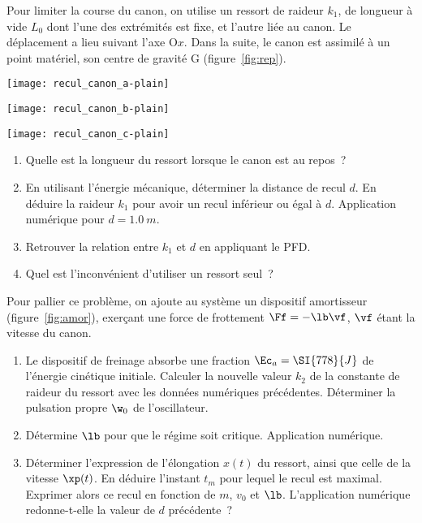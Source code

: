 \documentclass[a4paper, 12pt, final, garamond]{book}
\begin{document}
Pour limiter la course du canon, on utilise un ressort de raideur $k_1$, de
longueur à vide $L_0$ dont l'une des extrémités est fixe, et l'autre liée au
canon. Le déplacement a lieu suivant l'axe O$x$. Dans la suite, le canon est
assimilé à un point matériel, son centre de gravité G (figure~\ref{fig:rep}).

\begin{minipage}{0.40\linewidth}
    \begin{center}
        \texttt{[image: recul\_canon\_a-plain]}
        \label{fig:canon}
    \end{center}
\end{minipage}
\hfill
\begin{minipage}{0.23\linewidth}
    \begin{center}
        \texttt{[image: recul\_canon\_b-plain]}
        \label{fig:rep}
    \end{center}
\end{minipage}
\hfill
\begin{minipage}{0.31\linewidth}
    \begin{center}
        \texttt{[image: recul\_canon\_c-plain]}
        \label{fig:amor}
    \end{center}
\end{minipage} \bigbreak

\begin{enumerate}
    \item Quelle est la longueur du ressort lorsque le canon est au repos~?
    \item En utilisant l'énergie mécanique, déterminer la distance de recul $d$.
        En déduire la raideur $k_1$ pour avoir un recul inférieur ou égal à $d$.
        Application numérique pour $d = \SI{1.0}{m}$.
    \item Retrouver la relation entre $k_1$ et $d$ en appliquant le PFD.
    \item Quel est l'inconvénient d'utiliser un ressort seul~?
\end{enumerate}
Pour pallier ce problème, on ajoute au système un dispositif amortisseur
(figure~\ref{fig:amor}), exerçant une force de frottement $\Ff = -\lb\vf$, $\vf$
étant la vitesse du canon.
\begin{enumerate}[resume]
    \item Le dispositif de freinage absorbe une fraction $\Ec_a = \SI{778}{J}$
        de l'énergie cinétique initiale. Calculer la nouvelle valeur $k_2$ de la
        constante de raideur du ressort avec les données numériques précédentes.
        Déterminer la pulsation propre $\w_0$ de l'oscillateur.
    \item Détermine $\lb$ pour que le régime soit critique. Application
        numérique.
    \item Déterminer l'expression de l'élongation $x(t)$ du ressort, ainsi que
        celle de la vitesse $\xp(t)$. En déduire l'instant $t_m$ pour lequel le
        recul est maximal. Exprimer alors ce recul en fonction de $m$, $v_0$ et
        $\lb$. L'application numérique redonne-t-elle la valeur de $d$
        précédente~?
\end{enumerate}
\end{document}

